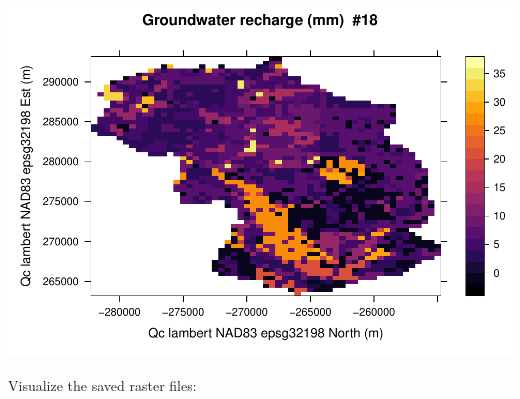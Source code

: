 \documentclass[
]{book}
\begin{document}
\includegraphics{fig/sim-viz-nc-1.pdf}

Visualize the saved raster files:
\end{document}

